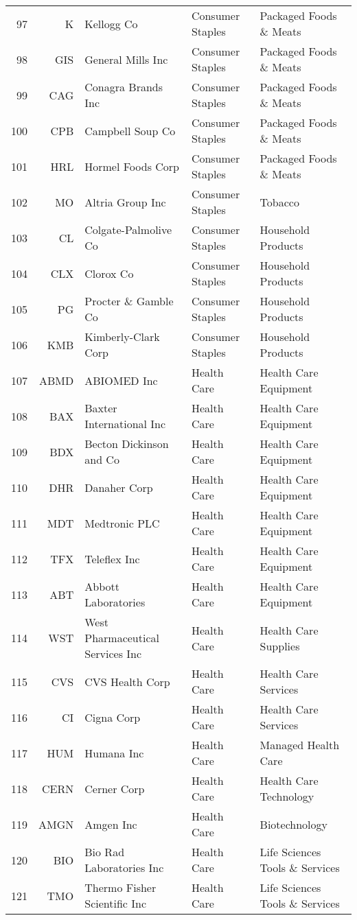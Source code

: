 \documentclass[aps, pra, groupedaddress, showkeys, twocolumn, floatfix, 10pt]{revtex4-2}
\begin{document}
{\begin{longtable}{rrllp{4cm}}
97&K&Kellogg Co&Consumer Staples&Packaged Foods \& Meats \\
98&GIS&General Mills Inc&Consumer Staples&Packaged Foods \& Meats \\
99&CAG&Conagra Brands Inc&Consumer Staples&Packaged Foods \& Meats \\
100&CPB&Campbell Soup Co&Consumer Staples&Packaged Foods \& Meats \\
101&HRL&Hormel Foods Corp&Consumer Staples&Packaged Foods \& Meats \\
102&MO&Altria Group Inc&Consumer Staples&Tobacco \\
103&CL&Colgate-Palmolive Co&Consumer Staples&Household Products \\
104&CLX&Clorox Co&Consumer Staples&Household Products \\
105&PG&Procter \& Gamble Co&Consumer Staples&Household Products \\
106&KMB&Kimberly-Clark Corp&Consumer Staples&Household Products \\
107&ABMD&ABIOMED Inc&Health Care&Health Care Equipment \\
108&BAX&Baxter International Inc&Health Care&Health Care Equipment \\
109&BDX&Becton Dickinson and Co&Health Care&Health Care Equipment \\
110&DHR&Danaher Corp&Health Care&Health Care Equipment \\
111&MDT&Medtronic PLC&Health Care&Health Care Equipment \\
112&TFX&Teleflex Inc&Health Care&Health Care Equipment \\
113&ABT&Abbott Laboratories&Health Care&Health Care Equipment \\
114&WST&West Pharmaceutical Services Inc&Health Care&Health Care Supplies \\
115&CVS&CVS Health Corp&Health Care&Health Care  Services \\
116&CI&Cigna Corp&Health Care&Health Care  Services \\
117&HUM&Humana Inc&Health Care&Managed Health Care \\
118&CERN&Cerner Corp&Health Care&Health Care Technology \\
119&AMGN&Amgen Inc&Health Care&Biotechnology \\
120&BIO&Bio Rad Laboratories Inc&Health Care&Life Sciences Tools \& Services \\
121&TMO&Thermo Fisher Scientific Inc&Health Care&Life Sciences Tools \& Services \\

\end{longtable}}
\end{document}
